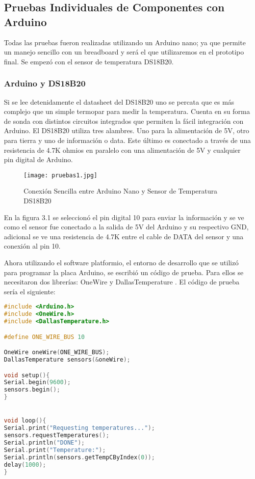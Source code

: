 \subsection{Pruebas Individuales de Componentes con Arduino }
\par \noindent
Todas las pruebas fueron realizadas utilizando un Arduino nano; ya que permite un manejo sencillo con un breadboard y será el que utilizaremos en el prototipo final. Se empezó con el sensor de temperatura DS18B20.

\subsubsection{Arduino y DS18B20}
\par 
Si se lee detenidamente el datasheet del DS18B20 uno se percata que es más complejo que un simple termopar para medir la temperatura. Cuenta en su forma de sonda con distintos circuitos integrados que permiten la fácil integración con Arduino. El DS18B20 utiliza tres alambres. Uno para la alimentación de 5V, otro para tierra y uno de información o data. Este último es conectado a través de una resistencia de 4.7K ohmios en paralelo con una alimentación de 5V y cualquier pin digital de Arduino. 

\begin{figure}[H]
	\centering
	\texttt{[image: pruebas1.jpg]}
	\caption{Conexión Sencilla entre Arduino Nano y Sensor de Temperatura DS18B20}
\end{figure}

\par \noindent
En la figura 3.1 se seleccionó el pin digital 10 para enviar la información y se ve como el sensor fue conectado a la salida de 5V del Arduino y su respectivo GND, adicional se ve una resistencia de 4.7K entre el cable de DATA del sensor y una conexión al pin 10. 

\par \noindent
Ahora utilizando el software platformio, el entorno de desarrollo que se utilizó para programar la placa Arduino, se escribió un código de prueba. Para ellos se necesitaron dos librerías: OneWire \cite{onewire-github} y DallasTemperature \cite{dallas-github}. El código de prueba sería el siguiente: \\

\begin{lstlisting}[language=C++, caption={Código Ejemplo para DS18B20}, captionpos=b]
#include <Arduino.h>
#include <OneWire.h>
#include <DallasTemperature.h>

#define ONE_WIRE_BUS 10

OneWire oneWire(ONE_WIRE_BUS);
DallasTemperature sensors(&oneWire);

void setup(){
Serial.begin(9600);
sensors.begin();
}


void loop(){
Serial.print("Requesting temperatures...");
sensors.requestTemperatures(); 
Serial.println("DONE");
Serial.print("Temperature:");
Serial.println(sensors.getTempCByIndex(0));
delay(1000);
}
\end{lstlisting}

